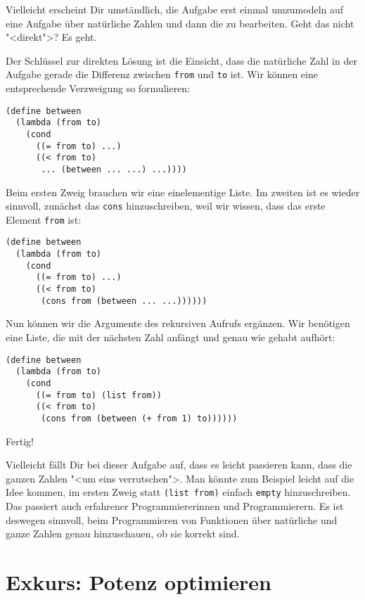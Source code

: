 Vielleicht erscheint Dir umständlich, die Aufgabe erst einmal
umzumodeln auf eine Aufgabe über natürliche Zahlen und dann die zu
bearbeiten.  Geht das nicht "<direkt">? Es geht.

Der Schlüssel zur direkten Lösung ist die Einsicht, dass die
natürliche Zahl in der Aufgabe gerade die Differenz zwischen
\lstinline{from} und \lstinline{to} ist.  Wir können eine
entsprechende Verzweigung so formulieren:
%
\begin{lstlisting}
(define between
  (lambda (from to)
    (cond
      ((= from to) ...)
      ((< from to)
       ... (between ... ...) ...))))
\end{lstlisting}
%
Beim ersten Zweig brauchen wir eine einelementige Liste.  Im zweiten
ist es wieder sinnvoll, zunächst das \lstinline{cons} hinzuschreiben,
weil wir wissen, dass das erste Element \lstinline{from} ist:
%
\begin{lstlisting}
(define between
  (lambda (from to)
    (cond
      ((= from to) ...)
      ((< from to)
       (cons from (between ... ...))))))
\end{lstlisting}
%
Nun können wir die Argumente des rekursiven Aufrufs ergänzen.  Wir
benötigen eine Liste, die mit der nächsten Zahl anfängt und genau wie
gehabt aufhört:
%
\begin{lstlisting}
(define between
  (lambda (from to)
    (cond
      ((= from to) (list from))
      ((< from to)
       (cons from (between (+ from 1) to))))))
\end{lstlisting}
%
Fertig!

Vielleicht fällt Dir bei dieser Aufgabe auf, dass es leicht passieren
kann, dass die ganzen Zahlen "<um eins verrutschen">.  Man könnte zum
Beispiel leicht auf die Idee kommen, im ersten Zweig statt
\lstinline{(list from)} einfach \lstinline{empty} hinzuschreiben.  Das
passiert auch erfahrener Programmiererinnen und Programmierern.  Es
ist deswegen sinnvoll, beim Programmieren von Funktionen über
natürliche und ganze Zahlen genau hinzuschauen, ob sie korrekt sind.

\section{Exkurs: Potenz optimieren}

